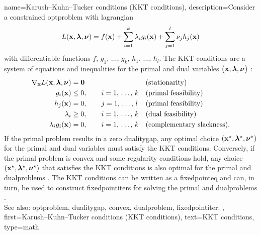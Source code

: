 {name={Karush--Kuhn--Tucker conditions (KKT conditions)},
	description={Consider a constrained \gls{optproblem} with \gls{lagrangian}
		\[
		L({\bf x}, {\bm \lambda}, {\bm \nu}) 
		= f({\bf x}) 
		+ \sum_{i=1}^{k} \lambda_i g_i({\bf x}) 
		+ \sum_{j=1}^{l} \nu_j h_j({\bf x})
		\]
		with \gls{differentiable} \glspl{function} $f, \,g_1, \,\ldots, \,g_k, \,h_1, \,\ldots, \,h_l$.	
		The  KKT conditions are  
		a system of equations and inequalities for the primal and 
		dual variables $\big({\bf x},{\bm \lambda},{\bm \nu}\big)$ \cite[Sec. 5.5.3]{BoydConvexBook}:
		\begin{align}
			 \nabla_{{\bf x}} L({\bf x}, {\bm \lambda}, {\bm \nu}) &= \mathbf{0}
			  && \text{(stationarity)} \nonumber\\
			  g_i({\bf x}) &\le 0, \qquad i=1,\,\ldots,\,k
			  && \text{(primal feasibility)} \nonumber\\
			  h_j({\bf x}) &= 0, \qquad j=1,\,\ldots,\,l
			  && \text{(primal feasibility)} \nonumber\\
			  \lambda_i &\ge 0, \qquad i=1,\,\ldots,\,k
			  && \text{(dual feasibility)} \nonumber\\
			  \lambda_i g_i({\bf x}) &= 0, \qquad i=1,\,\ldots,\,k
			  && \text{(complementary slackness).} \nonumber
		\end{align}
		If the primal problem results in a zero \gls{dualitygap}, 
		any optimal choice $({\bf x}^\star,{\bm \lambda}^\star,{\bm \nu}^\star)$ 
		for the primal and dual variables must satisfy the KKT conditions. 
		Conversely, if the primal problem is \gls{convex} and some regularity 
		conditions hold, any choice $({\bf x}^\star,{\bm \lambda}^\star,{\bm \nu}^\star)$ 
		that satisfies the KKT conditions is also optimal for the primal and \glspl{dualproblem} \cite{BoydConvexBook}.
		The KKT conditions can be written as a \gls{fixedpointeq} 
		and can, in turn, be used to construct \glspl{fixedpointiter} for solving 
		the primal and \glspl{dualproblem} \cite{BoydConvexBook}.
		\\
		See also: \gls{optproblem}, \gls{dualitygap}, \gls{convex}, \gls{dualproblem}, \gls{fixedpointiter}. },
	first={Karush--Kuhn--Tucker conditions (KKT conditions)},
	text={KKT conditions},
	type=math
}

